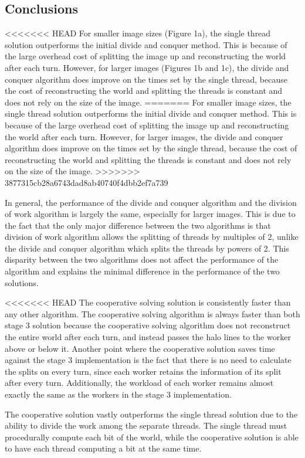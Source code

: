 \documentclass[10pt,a4paper,dvipsnames,cmyk]{scrartcl}
\begin{document}
\begin{samepage}
\subsection*{Conclusions}%
\label{sub:Conclusions}
<<<<<<< HEAD
For smaller image sizes (Figure 1a), the single thread solution
outperforms the initial divide and conquer method. This is because of the
large overhead cost of splitting the image up and reconstructing the world
after each turn.  However, for larger images (Figures 1b and 1c), the
divide and conquer algorithm does improve on the times set by the single
thread, because the cost of reconstructing the world and splitting the
threads is constant and does not rely on the size of the image.
=======
For smaller image sizes, the single thread solution outperforms the
initial divide and conquer method. This is because of the large overhead
cost of splitting the image up and reconstructing the world after each
turn.  However, for larger images, the divide and conquer algorithm does
improve on the times set by the single thread, because the cost of
reconstructing the world and splitting the threads is constant and does
not rely on the size of the image.
>>>>>>> 3877315cb28a6743dad8ab40740f4dbb2ef7a739

In general, the performance of the divide and conquer algorithm and the
division of work algorithm is largely the same, especially for larger
images. This is due to the fact that the only major difference between the
two algorithms is that division of work algorithm allows the splitting of
threads by multiples of 2, unlike the divide and conquer algorithm which
splits the threads by powers of 2. This disparity between the two algorithms
does not affect the performance of the algorithm and explains the minimal
difference in the performance of the two solutions.

<<<<<<< HEAD
The cooperative solving solution is consistently faster than any other
algorithm. The cooperative solving algorithm is always faster than both
stage 3 solution because the cooperative solving algorithm does not
reconstruct the entire world after each turn, and instead passes the halo
lines to the worker above or below it. Another point where the cooperative
solution saves time against the stage 3 implementation is the fact that
there is no need to calculate the splits on every turn, since each worker
retains the information of its split after every turn. Additionally, the
workload of each worker remains almost exactly the same as the workers in
the stage 3 implementation.

The cooperative solution vastly outperforms the single thread solution due
to the ability to divide the work among the separate threads. The single
thread must procedurally compute each bit of the world, while the
cooperative solution is able to have each thread computing a bit at the
same time.
\end{samepage}
\end{document}
